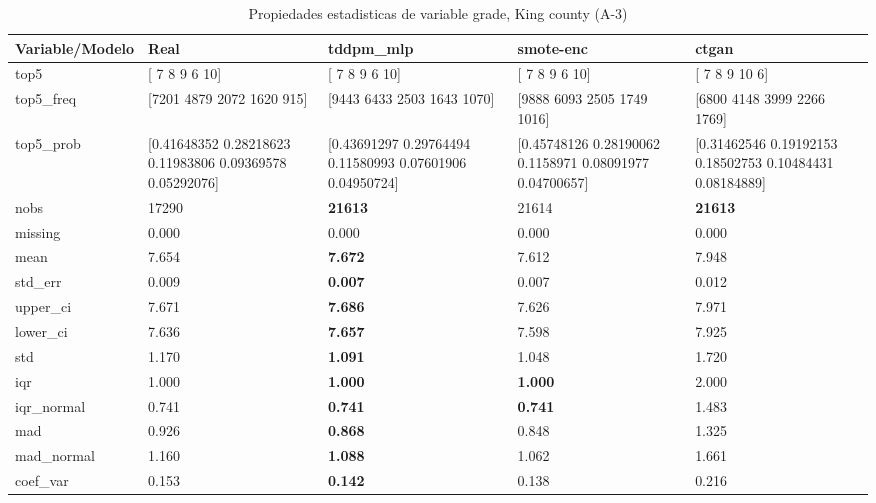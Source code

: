 \begin{table}[H]
\centering
\fontsize{8}{14}\selectfont
\caption{Propiedades  estadisticas de variable grade, King county (A-3)}
\label{table-stats-king county-a-3-grade}
\begin{tabular}{|l|m{10em}|m{10em}|m{10em}|m{10em}|}
\hline
 \rowcolor[gray]{0.8}
Variable/Modelo & Real & tddpm\_mlp & smote-enc & ctgan \\
\hline top5 & [ 7  8  9  6 10] & [ 7  8  9  6 10] & [ 7  8  9  6 10] & [ 7  8  9 10  6] \\
\hline top5\_freq & [7201 4879 2072 1620  915] & [9443 6433 2503 1643 1070] & [9888 6093 2505 1749 1016] & [6800 4148 3999 2266 1769] \\
\hline top5\_prob & [0.41648352 0.28218623 0.11983806 0.09369578 0.05292076] & [0.43691297 0.29764494 0.11580993 0.07601906 0.04950724] & [0.45748126 0.28190062 0.1158971  0.08091977 0.04700657] & [0.31462546 0.19192153 0.18502753 0.10484431 0.08184889] \\
\hline nobs & 17290 & \bfseries 21613 & \cellcolor[rgb]{0.9, 0.54, 0.52} 21614 & \bfseries 21613 \\
\hline missing & 0.000 & 0.000 & 0.000 & 0.000 \\
\hline mean & 7.654 & \bfseries 7.672 & 7.612 & \cellcolor[rgb]{0.9, 0.54, 0.52} 7.948 \\
\hline std\_err & 0.009 & \bfseries 0.007 & 0.007 & \cellcolor[rgb]{0.9, 0.54, 0.52} 0.012 \\
\hline upper\_ci & 7.671 & \bfseries 7.686 & 7.626 & \cellcolor[rgb]{0.9, 0.54, 0.52} 7.971 \\
\hline lower\_ci & 7.636 & \bfseries 7.657 & 7.598 & \cellcolor[rgb]{0.9, 0.54, 0.52} 7.925 \\
\hline std & 1.170 & \bfseries 1.091 & 1.048 & \cellcolor[rgb]{0.9, 0.54, 0.52} 1.720 \\
\hline iqr & 1.000 & \bfseries 1.000 & \bfseries 1.000 & \cellcolor[rgb]{0.9, 0.54, 0.52} 2.000 \\
\hline iqr\_normal & 0.741 & \bfseries 0.741 & \bfseries 0.741 & \cellcolor[rgb]{0.9, 0.54, 0.52} 1.483 \\
\hline mad & 0.926 & \bfseries 0.868 & 0.848 & \cellcolor[rgb]{0.9, 0.54, 0.52} 1.325 \\
\hline mad\_normal & 1.160 & \bfseries 1.088 & 1.062 & \cellcolor[rgb]{0.9, 0.54, 0.52} 1.661 \\
\hline coef\_var & 0.153 & \bfseries 0.142 & 0.138 & \cellcolor[rgb]{0.9, 0.54, 0.52} 0.216 \\

\end{tabular}
\end{table}
